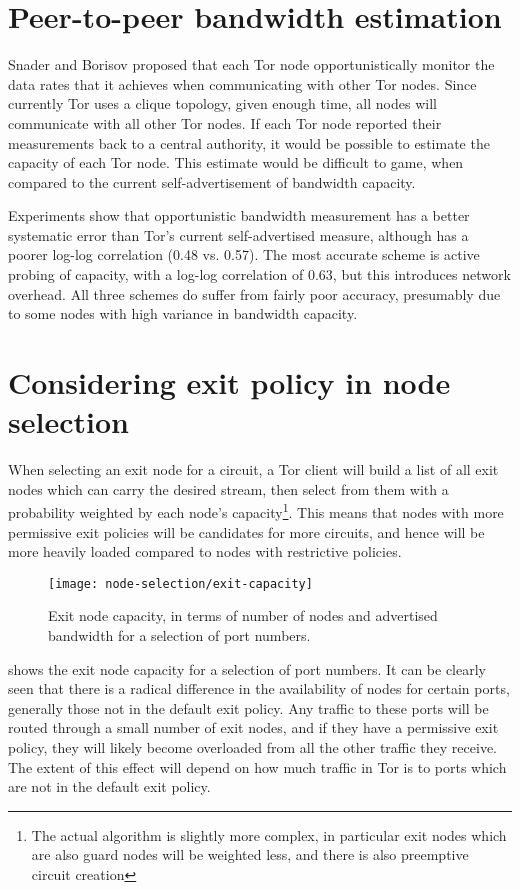 \documentclass{article}
\begin{document}
\section{Peer-to-peer bandwidth estimation}

Snader and Borisov proposed that each Tor node opportunistically monitor the data rates that it achieves when communicating with other Tor nodes.
Since currently Tor uses a clique topology, given enough time, all nodes will communicate with all other Tor nodes.
If each Tor node reported their measurements back to a central authority, it would be possible to estimate the capacity of each Tor node.
This estimate would be difficult to game, when compared to the current self-advertisement of bandwidth capacity.

Experiments show that opportunistic bandwidth measurement has a better systematic error than Tor's current self-advertised measure, although has a poorer log-log correlation (0.48 vs. 0.57).
The most accurate scheme is active probing of capacity, with a log-log correlation of 0.63, but this introduces network overhead.
All three schemes do suffer from fairly poor accuracy, presumably due to some nodes with high variance in bandwidth capacity.

\section{Considering exit policy in node selection}

When selecting an exit node for a circuit, a Tor client will build a list of all exit nodes which can carry the desired stream, then select from them with a probability weighted by each node's capacity\footnote{The actual algorithm is slightly more complex, in particular exit nodes which are also guard nodes will be weighted less, and there is also preemptive circuit creation}.
This means that nodes with more permissive exit policies will be candidates for more circuits, and hence will be more heavily loaded compared to nodes with restrictive policies.

\begin{figure}
\texttt{[image: node-selection/exit-capacity]}
\caption{Exit node capacity, in terms of number of nodes and advertised bandwidth for a selection of port numbers.}
\label{fig:exit-capacity}
\end{figure}

 shows the exit node capacity for a selection of port numbers.
It can be clearly seen that there is a radical difference in the availability of nodes for certain ports, generally those not in the default exit policy.
Any traffic to these ports will be routed through a small number of exit nodes, and if they have a permissive exit policy, they will likely become overloaded from all the other traffic they receive.
The extent of this effect will depend on how much traffic in Tor is to ports which are not in the default exit policy.
\end{document}
